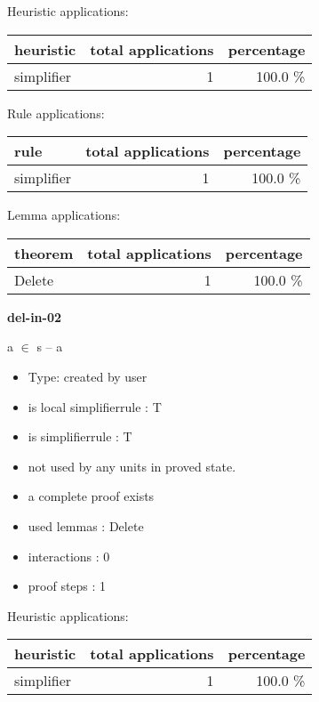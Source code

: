 \documentclass[a4paper]{article}
\begin{document}
Heuristic applications:

\begin{supertabular}{l|r|r}
heuristic	& total applications & percentage \\ \hline
simplifier & 1 & 100.0 \% \\

\end{supertabular}

Rule applications:

\begin{supertabular}{l|r|r}
rule	        & total applications & percentage \\ \hline
simplifier & 1 & 100.0 \% \\

\end{supertabular}

Lemma applications:

\begin{supertabular}{l|r|r}
theorem	        & total applications & percentage \\ \hline
Delete & 1 & 100.0 \% \\

\end{supertabular}
\pagebreak

{\LARGE\bf del-in-02}\label{lemma-del-in-02}

\medskip

 \Fol \Not a $\in$ s -- a

\begin{itemize}

\item Type: created by user

\item is local simplifierrule : T
\item is simplifierrule : T
\item not used by any units in proved state.
\item       a complete proof exists
\item       used lemmas  : Delete
\item       interactions : 0
\item       proof steps  : 1
\end{itemize}

\medskip


Heuristic applications:

\begin{supertabular}{l|r|r}
heuristic	& total applications & percentage \\ \hline
simplifier & 1 & 100.0 \% \\

\end{supertabular}
\end{document}
